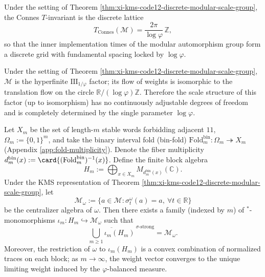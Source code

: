\begin{corollary}\label{cor:xi-kms-code12-connes-T-invariant}
Under the setting of Theorem \ref{thm:xi-kms-code12-discrete-modular-scale-group},
the Connes \(T\)-invariant is the discrete lattice
\[
T_{\mathrm{Connes}}(\mathcal M)=\frac{2\pi}{\log\varphi}\,\mathbb Z,
\]
so that the inner implementation times of the modular automorphism group form a discrete grid with fundamental spacing locked by \(\log\varphi\).
\end{corollary}

\begin{corollary}\label{cor:xi-kms-code12-type-rigidity}
Under the setting of Theorem \ref{thm:xi-kms-code12-discrete-modular-scale-group},
\(\mathcal M\) is the hyperfinite \(\mathrm{III}_{1/\varphi}\) factor;
its flow of weights is isomorphic to the translation flow on the circle \(\mathbb R/(\log\varphi)\mathbb Z\).
Therefore the scale structure of this factor (up to isomorphism) has no continuously adjustable degrees of freedom and is completely determined by the single parameter \(\log\varphi\).
\end{corollary}

\begin{proposition}\label{prop:xi-fold-microblock-centralizer-strong-density}
Let \(X_m\) be the set of length-\(m\) stable words forbidding adjacent \(11\), \(\Omega_m:=\{0,1\}^m\), and take the binary interval fold (bin-fold)
\(
\mathrm{Fold}^{\mathrm{bin}}_m:\Omega_m\twoheadrightarrow X_m
\)
(Appendix \ref{app:fold-multiplicity}).
Denote the fiber multiplicity \(d_m^{\mathrm{bin}}(x):=\card{(\mathrm{Fold}^{\mathrm{bin}}_m)^{-1}(x)}\).
Define the finite block algebra
\[
H_m:=\bigoplus_{x\in X_m} M_{d_m^{\mathrm{bin}}(x)}(\mathbb C).
\]
Under the KMS representation of Theorem \ref{thm:xi-kms-code12-discrete-modular-scale-group}, let
\[
\mathcal M_\omega:=\{a\in\mathcal M:\sigma_t^\omega(a)=a,\ \forall t\in\mathbb R\}
\]
be the centralizer algebra of \(\omega\).
Then there exists a family (indexed by \(m\)) of \(^\ast\)-monomorphisms \(\iota_m:H_m\hookrightarrow \mathcal M_\omega\) such that
\[
\overline{\bigcup_{m\ge 1}\iota_m(H_m)}^{\ \sigma\text{-strong}}=\mathcal M_\omega.
\]
Moreover, the restriction of \(\omega\) to \(\iota_m(H_m)\) is a convex combination of normalized traces on each block; as \(m\to\infty\), the weight vector converges to the unique limiting weight induced by the \(\varphi\)-balanced measure.
\end{proposition}

